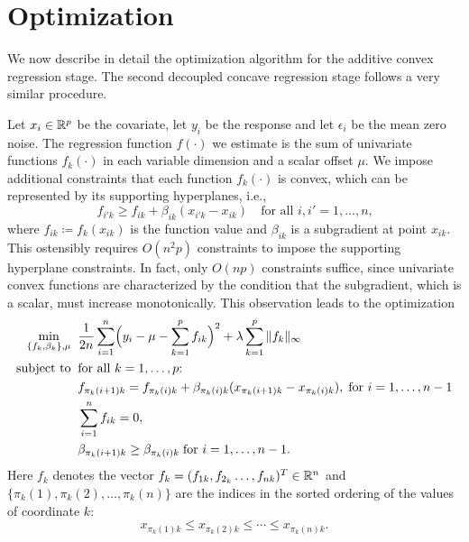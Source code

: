 \def\uds#1{#1}
\def\perm#1{\pi_k(#1)}

\section{Optimization}
\label{sec:optimization}

We now describe in detail the optimization algorithm for the additive
convex regression stage.  The second decoupled concave regression stage
follows a very similar procedure.

Let $x_{i}\in\mathbb{R}^{p}$ be the covariate, let $y_{i}$ be
the response and let $\epsilon_{i}$ be the mean zero noise. The
regression function $f(\cdot)$ we estimate is the sum of
univariate functions $f_{k}(\cdot)$ in each variable dimension and a scalar
offset $\mu$.  We impose additional constraints that each
function $f_{k}(\cdot)$ is convex, which can be
represented by its supporting hyperplanes, i.e.,
\begin{equation}\label{hyper}
      f_{i'k} \geq f_{ik} + \beta_{ik}(x_{i'k}-x_{ik}) \quad
      \textrm{for all $i,i' = 1,\ldots, n$,}
\end{equation}
where $f_{ik}\coloneqq f_{k}(x_{ik})$ is the function value and $\beta_{ik}$ is a
subgradient at point $x_{ik}$. This ostensibly requires $O(n^2 p)$ constraints to
impose the supporting hyperplane constraints.
In fact, only $O(np)$
constraints suffice, since univariate convex functions are
characterized by the condition that the subgradient, which is a scalar, must
increase monotonically. This observation leads to the  optimization
\begin{equation}
\begin{split}
       \min_{\{f_k,\beta_k\},\mu} & \;\; \frac{1}{2n}\sum_{i=1}^{n}
                     \Bigl( y_{i}-\mu - \sum_{k=1}^{p}f_{ik}\Bigr)^{2} 
                         + \lambda\sum_{k=1}^{p}\|f_k\|_{\infty} \\
       \textrm{subject to} &\;\; \textrm{for all $k=1,\ldots, p$:}\\
       & \;\; f_{\perm{i+1} k} = f_{\perm{i} k} +
       \beta_{\perm{i} k}(x_{\perm{i+1} k}-x_{\perm{i} k}),\;\textrm{for $i=1,\ldots, n-1$}\\
       & \;\; \sum_{i=1}^{n}f_{ik}=0,\\
       & \;\; \beta_{\perm{i+1} k} \geq \beta_{\perm{i} k}\;\textrm{for $i=1,\ldots, n-1$}.
\end{split}
\label{np}
\end{equation}
Here $f_k$ denotes the vector $f_k = (f_{1k}, f_{2_k}\ldots, f_{nk})^T\in{\mathbb R}^n$
and $\{\perm{1},\perm{2},\ldots,\perm{n}\}$ are the indices in the sorted ordering
of the values of coordinate $k$:
\begin{equation}
x_{\perm{1} k} \leq{} x_{\perm{2} k} \leq \cdots \leq{} x_{\perm{n} k}.
\end{equation}


